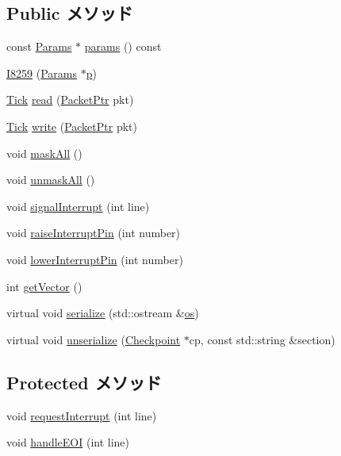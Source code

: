 \subsection*{Public メソッド}
\begin{DoxyCompactItemize}
\item 
const \hyperlink{classX86ISA_1_1I8259_a370f3ee3a425cd3262c46d09b80327fe}{Params} $\ast$ \hyperlink{classX86ISA_1_1I8259_acd3c3feb78ae7a8f88fe0f110a718dff}{params} () const 
\item 
\hyperlink{classX86ISA_1_1I8259_aa1c12bc35b1690e4820a82dedc82a062}{I8259} (\hyperlink{classX86ISA_1_1I8259_a370f3ee3a425cd3262c46d09b80327fe}{Params} $\ast$\hyperlink{namespaceX86ISA_af675c1d542a25b96e11164b80809a856}{p})
\item 
\hyperlink{base_2types_8hh_a5c8ed81b7d238c9083e1037ba6d61643}{Tick} \hyperlink{classX86ISA_1_1I8259_a613ec7d5e1ec64f8d21fec78ae8e568e}{read} (\hyperlink{classPacket}{PacketPtr} pkt)
\item 
\hyperlink{base_2types_8hh_a5c8ed81b7d238c9083e1037ba6d61643}{Tick} \hyperlink{classX86ISA_1_1I8259_a4cefab464e72b5dd42c003a0a4341802}{write} (\hyperlink{classPacket}{PacketPtr} pkt)
\item 
void \hyperlink{classX86ISA_1_1I8259_ae0783eb10ff8764efd2be0ef4adac66b}{maskAll} ()
\item 
void \hyperlink{classX86ISA_1_1I8259_a08091cbfeb72a8155e4a7fc5b93defa8}{unmaskAll} ()
\item 
void \hyperlink{classX86ISA_1_1I8259_a9d80b13f2832340962ab374bc9a14c4f}{signalInterrupt} (int line)
\item 
void \hyperlink{classX86ISA_1_1I8259_ac26dfa4264d910f3ef50015beafea211}{raiseInterruptPin} (int number)
\item 
void \hyperlink{classX86ISA_1_1I8259_a41406df644356ee1578b77b1acd18042}{lowerInterruptPin} (int number)
\item 
int \hyperlink{classX86ISA_1_1I8259_a26bce2cbf4beafc63b23e5d0fbf140b8}{getVector} ()
\item 
virtual void \hyperlink{classX86ISA_1_1I8259_a53e036786d17361be4c7320d39c99b84}{serialize} (std::ostream \&\hyperlink{namespaceX86ISA_a6b6e6ba763e7eaf46ac5b6372ca98d30}{os})
\item 
virtual void \hyperlink{classX86ISA_1_1I8259_af22e5d6d660b97db37003ac61ac4ee49}{unserialize} (\hyperlink{classCheckpoint}{Checkpoint} $\ast$cp, const std::string \&section)
\end{DoxyCompactItemize}
\subsection*{Protected メソッド}
\begin{DoxyCompactItemize}
\item 
void \hyperlink{classX86ISA_1_1I8259_a432db50d8e5302081e6d1dec35a7a963}{requestInterrupt} (int line)
\item 
void \hyperlink{classX86ISA_1_1I8259_a98fd3afbe3f7046e1b5d9d9f928b8482}{handleEOI} (int line)
\end{DoxyCompactItemize}
